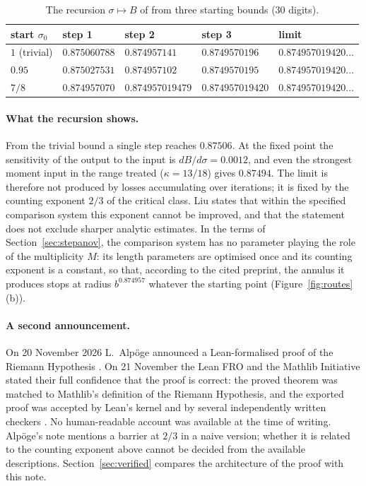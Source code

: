 \documentclass[11pt,a4paper]{article}
\theoremstyle{definition}\newtheorem{definition}[proposition]{Definition}
\theoremstyle{remark}\newtheorem{remark}[proposition]{Remark}
\begin{document}
\begin{table}[ht]\centering\small
\caption{The recursion $\sigma\mapsto B$ of \cite{Liu2026} from three starting bounds ($30$ digits).}\label{tab:quasirh}
\begin{tabular}{lllll}
\toprule
start $\sigma_0$ & step 1 & step 2 & step 3 & limit\\
\midrule
$1$ (trivial) & $0.875060788$ & $0.874957141$ & $0.8749570196$ & $0.874957019420\ldots$\\
$0.95$ & $0.875027531$ & $0.874957102$ & $0.8749570195$ & $0.874957019420\ldots$\\
$7/8$ & $0.874957070$ & $0.874957019479$ & $0.874957019420$ & $0.874957019420\ldots$\\
\bottomrule
\end{tabular}
\end{table}

\paragraph{What the recursion shows.} From the trivial bound a single step reaches $0.87506$. At the fixed point the sensitivity of the output to the input is $dB/d\sigma=0.0012$, and even the strongest moment input in the range treated ($\kappa=13/18$) gives $0.87494$. The limit is therefore not produced by losses accumulating over iterations; it is fixed by the counting exponent $2/3$ of the critical class. Liu states that within the specified comparison system this exponent cannot be improved, and that the statement does not exclude sharper analytic estimates. In the terms of Section~\ref{sec:stepanov}, the comparison system has no parameter playing the role of the multiplicity $M$: its length parameters are optimised once and its counting exponent is a constant, so that, according to the cited preprint, the annulus it produces stops at radius $b^{0.874957}$ whatever the starting point (Figure~\ref{fig:routes}(b)).

\paragraph{A second announcement.} On 20 November 2026 L.~Alp\"oge announced a Lean-formalised proof of the Riemann Hypothesis \cite{Alpoge2026}. On 21 November the Lean FRO and the Mathlib Initiative stated their full confidence that the proof is correct: the proved theorem was matched to Mathlib's definition of the Riemann Hypothesis, and the exported proof was accepted by Lean's kernel and by several independently written checkers \cite{LeanStatement2026}. No human-readable account was available at the time of writing. Alp\"oge's note mentions a barrier at $2/3$ in a naive version; whether it is related to the counting exponent above cannot be decided from the available descriptions. Section~\ref{sec:verified} compares the architecture of the proof with this note.
\end{document}
